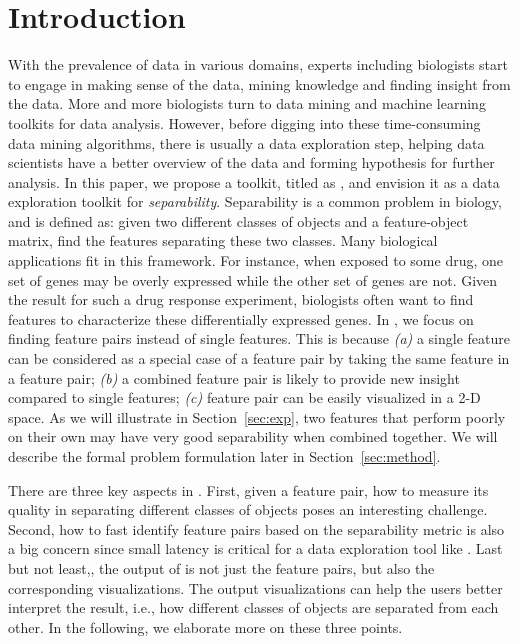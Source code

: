 

\section{Introduction}
\label{sec:intro}
With the prevalence of data in various domains, experts including biologists start to engage in making sense of the data, mining knowledge and finding insight from the data. 
More and more biologists turn to data mining and machine learning toolkits for data analysis. However, before digging into these time-consuming data mining algorithms, there is usually a data exploration step, helping data scientists have a better overview of the data and forming hypothesis for further analysis. In this paper, we propose a toolkit, titled as \genviz, and envision it as a data exploration toolkit for {\em separability}. Separability is a common problem in biology, and is defined as: given two different classes of objects and a feature-object matrix, find the \topk features separating these two classes. Many biological applications fit in this framework.
For instance, when exposed to some drug, one set of genes may be overly expressed while the other set of genes are not. Given the result for such a drug response experiment, biologists often want to find features to characterize these differentially expressed genes. 
In \genviz, we focus on finding \topk feature pairs instead of \topk single features. This is because 
{\em (a)} a single feature can be considered as a special case of a feature pair by taking the same feature in a feature pair;
{\em (b)} a combined feature pair is likely to provide new insight compared to single features;
{\em (c)} feature pair can be easily visualized in a 2-D space.
As we will illustrate in Section~\ref{sec:exp}, two features that perform poorly on their own may have very good separability when combined together. We will describe the formal problem formulation later in Section~\ref{sec:method}. 


There are three key aspects in \genviz. First, given a feature pair, how to measure its quality in separating different classes of objects poses an interesting challenge. Second, how to fast identify \topk feature pairs based on the separability metric is also a big concern since small latency is critical for a data exploration tool like \genviz. Last but not least,, the output of \genviz is not just the \topk feature pairs, but also the corresponding visualizations. The output visualizations can help the users better interpret the result, i.e., how different classes of objects are separated from each other. In the following, we elaborate more on these three points. 



